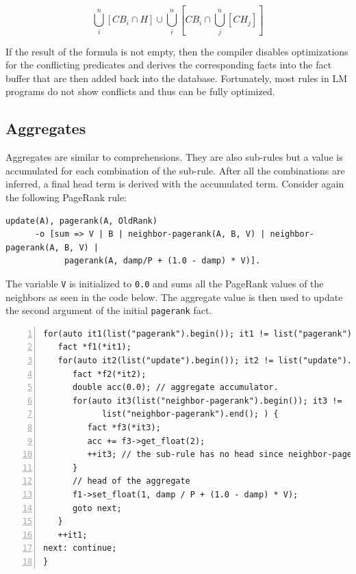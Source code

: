 \[
\bigcup^{n}_i[CB_i \cap H] \cup \bigcup^{n}_i [CB_i \cap \bigcup^{n}_j[CH_j]]
\]

If the result of the formula is not empty, then the compiler disables
optimizations for the conflicting predicates and derives the corresponding facts
into the fact buffer that are then added back into the database.
Fortunately, most rules in LM programs do not show conflicts and thus
can be fully optimized.

\subsection{Aggregates}

Aggregates are similar to comprehensions. They are also sub-rules but a value is
accumulated for each combination of the sub-rule. After all the combinations are
inferred, a final head term is derived with the accumulated term. Consider again
the following PageRank rule:

\begin{Verbatim}[fontsize=\scriptsize]
update(A), pagerank(A, OldRank)
      -o [sum => V | B | neighbor-pagerank(A, B, V) | neighbor-pagerank(A, B, V) |
            pagerank(A, damp/P + (1.0 - damp) * V)].
\end{Verbatim}

The variable \texttt{V} is initialized to \texttt{0.0} and sums all
the PageRank values of the neighbors as seen in the code below. The aggregate
value is then used to update the second argument of the initial
\texttt{pagerank} fact.

\begin{Verbatim}[numbers=left,fontsize=\scriptsize,xleftmargin=\codemargin]
for(auto it1(list("pagerank").begin()); it1 != list("pagerank").end(); ) {
   fact *f1(*it1);
   for(auto it2(list("update").begin()); it2 != list("update").end(); ) {
      fact *f2(*it2);
      double acc(0.0); // aggregate accumulator.
      for(auto it3(list("neighbor-pagerank").begin()); it3 !=
            list("neighbor-pagerank").end(); ) {
         fact *f3(*it3);
         acc += f3->get_float(2);
         ++it3; // the sub-rule has no head since neighbor-pagerank is re-derived
      }
      // head of the aggregate
      f1->set_float(1, damp / P + (1.0 - damp) * V);
      goto next;
   }
   ++it1;
next: continue;
}
\end{Verbatim}
